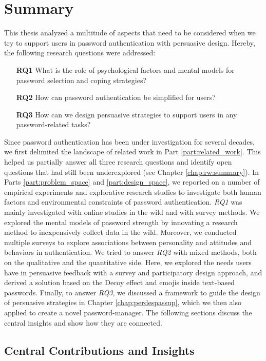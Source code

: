 \chapter[Summary]{Summary}\label{chap:summary}
This thesis analyzed a multitude of aspects that need to be considered when we try to support users in password authentication with persuasive design. Hereby, the following research questions were addressed:

\begin{itemize}
	\item[\textbf{RQ1}] What is the role of psychological factors and mental models for password selection and coping strategies?
	\item[\textbf{RQ2}] How can password authentication be simplified for users? 
	\item[\textbf{RQ3}] How can we design persuasive strategies to support users in any password-related tasks?
\end{itemize}

Since password authentication has been under investigation for several decades, we first delimited the landscape of related work in Part \ref{part:related_work}. This helped us partially answer all three research questions and identify open questions that had still been underexplored (see Chapter \ref{chap:rw:summary}). In Parts \ref{part:problem_space} and \ref{part:design_space}, we reported on a number of empirical experiments and explorative research studies to investigate both human factors and environmental constraints of password authentication. \textit{RQ1} was mainly investigated with online studies in the wild and with survey methods. We explored the mental models of password strength by innovating a research method to inexpensively collect data in the wild. Moreover, we conducted multiple surveys to explore associations between personality and attitudes and behaviors in authentication. We tried to answer \textit{RQ2} with mixed methods, both on the qualitative and the quantitative side. Here, we explored the needs users have in persuasive feedback with a survey and participatory design approach, and derived a solution based on the Decoy effect and emojis inside text-based passwords. Finally, to answer \textit{RQ3}, we discussed a framework to guide the design of persuasive strategies in Chapter \ref{chap:perdespassup}, which we then also applied to create a novel password-manager. The following sections discuss the central insights and show how they are connected.

\section{Central Contributions and Insights}
